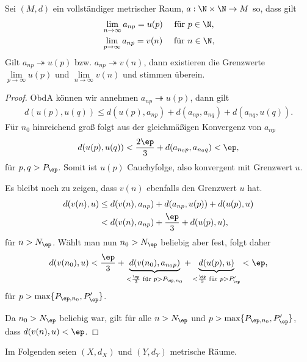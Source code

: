 \begin{prop}
\label{prop:1.16}
Sei $(M,d)$ ein vollständiger metrischer Raum, $a : \N\times\N \to M$ so, dass
gilt
\begin{align*}
&\lim\limits_{n\to\infty} a_{np} = u(p) \quad \text{ für } p\in\N,\\
&\lim\limits_{p\to\infty} a_{np} = v(n) \quad \text{ für } n\in\N,
\end{align*}
Gilt $a_{np}\twoheadrightarrow u(p)$ bzw. $a_{np}\twoheadrightarrow v(n)$, dann
existieren die Grenzwerte $\lim\limits_{p\to\infty} u(p)$ und
$\lim\limits_{n\to\infty} v(n)$ und stimmen überein.\fishhere
\end{prop}

\begin{proof}
ObdA können wir annehmen $a_{np}\twoheadrightarrow u(p)$, dann gilt
\begin{align*}
d(u(p),u(q)) \le d(u(p),a_{np}) + d(a_{np},a_{nq}) + d(a_{nq},u(q)).
\end{align*}
Für $n_0$ hinreichend groß folgt aus der gleichmäßigen Konvergenz von $a_{np}$
\begin{align*}
d(u(p),u(q)) < \frac{2\ep}{3} + d(a_{n_0p},a_{n_0q}) < \ep,
\end{align*}
für $p,q > P_\ep$. Somit ist $u(p)$ Cauchyfolge, also konvergent mit Grenzwert
$u$.

Es bleibt noch zu zeigen, dass $v(n)$ ebenfalls den Grenzwert $u$ hat.
\begin{align*}
d(v(n),u) &\le d(v(n),a_{np}) + d(a_{np},u(p)) + d(u(p),u)\\
&< d(v(n),a_{np}) + \frac{\ep}{3} + d(u(p),u),
\end{align*}
für $n> N_\ep$. Wählt man nun $n_0 > N_\ep$ beliebig aber fest, folgt daher
\begin{align*}
d(v(n_0),u) < \frac{\ep}{3} + \underbrace{d(v(n_0),a_{n_0p})}_{< \frac{\ep}{3}
\text{ für } p > P_{\ep,n_0}} + \underbrace{d(u(p),u)}_{< \frac{\ep}{3} \text{ für } 
p > P_\ep'} < \ep,
\end{align*}
für $p > \max\{P_{\ep,n_0}, P_\ep'\}$.

Da $n_0>N_\ep$ beliebig war, gilt
für alle $n>N_\ep$ und $p > \max\{P_{\ep,n_0}, P_\ep'\}$, dass $d(v(n),u) <
\ep$.\qedhere
\end{proof}

\begin{bem}[Festlegung]
\label{bem:1.17}
Im Folgenden seien $(X,d_X)$ und $(Y,d_Y)$ metrische Räume.\maphere
\end{bem}

